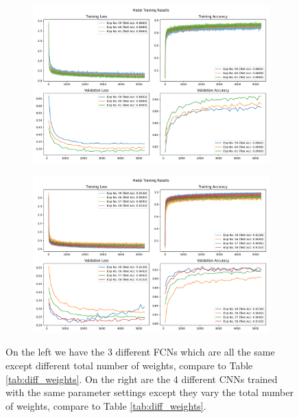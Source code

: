 \documentclass[11pt]{amsart}
\begin{document}
\begin{figure}[h]
    \centering
    \begin{subfigure}{0.49\textwidth}
        \centering
        \includegraphics[width=.9\textwidth]{../visualizations/model_training_results_vis_2.png}
        \label{fig:image1}
    \end{subfigure}
    \begin{subfigure}{0.49\textwidth}
        \centering
        \includegraphics[width=.9\textwidth]{../visualizations/model_training_results_vis_3.png}
        \label{fig:image2}
    \end{subfigure}
    \caption{On the left we have the 3 different FCNs which are all the same except different total number of weights, compare to Table \ref{tab:diff_weights}.
    On the right are the 4 different CNNs trained with the same parameter settings except they vary the total number of weights, compare to Table \ref{tab:diff_weights}.}
    \label{fig:f0}
\end{figure}
\end{document}
